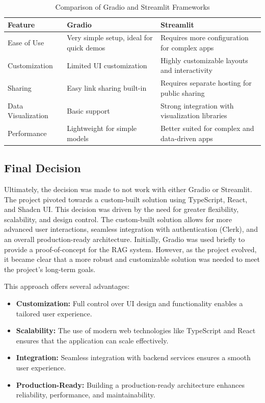 \documentclass[12pt]{report}
\begin{document}
\begin{table}[h]
\centering
\caption{Comparison of Gradio and Streamlit Frameworks}
\begin{tabular}{|l|p{6cm}|p{6cm}|}
\hline
\textbf{Feature} & \textbf{Gradio} & \textbf{Streamlit} \\ \hline
Ease of Use & Very simple setup, ideal for quick demos & Requires more configuration for complex apps \\ \hline
Customization & Limited UI customization & Highly customizable layouts and interactivity \\ \hline
Sharing & Easy link sharing built-in & Requires separate hosting for public sharing \\ \hline
Data Visualization & Basic support & Strong integration with visualization libraries \\ \hline
Performance & Lightweight for simple models & Better suited for complex and data-driven apps \\ \hline
\end{tabular}
\end{table}


\subsection{Final Decision}
Ultimately, the decision was made to not work with either Gradio or Streamlit. The project pivoted towards a custom-built solution using TypeScript, React, and Shadcn UI. This decision was driven by the need for greater flexibility, scalability, and design control. The custom-built solution allows for more advanced user interactions, seamless integration with authentication (Clerk), and an overall production-ready architecture. Initially, Gradio was used briefly to provide a proof-of-concept for the RAG system. However, as the project evolved, it became clear that a more robust and customizable solution was needed to meet the project's long-term goals.

This approach offers several advantages:
\begin{itemize}
    \item \textbf{Customization:} Full control over UI design and functionality enables a tailored user experience.
    \item \textbf{Scalability:} The use of modern web technologies like TypeScript and React ensures that the application can scale effectively.
    \item \textbf{Integration:} Seamless integration with backend services ensures a smooth user experience.
    \item \textbf{Production-Ready:} Building a production-ready architecture enhances reliability, performance, and maintainability.
\end{itemize}
\end{document}
